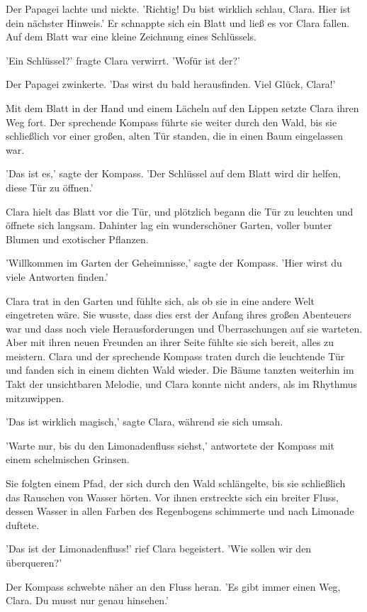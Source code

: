 \documentclass[12pt]{article}
\begin{document}
Der Papagei lachte und nickte. 'Richtig! Du bist wirklich schlau, Clara. Hier ist dein nächster Hinweis.' Er schnappte sich ein Blatt und ließ es vor Clara fallen. Auf dem Blatt war eine kleine Zeichnung eines Schlüssels.

'Ein Schlüssel?' fragte Clara verwirrt. 'Wofür ist der?'

Der Papagei zwinkerte. 'Das wirst du bald herausfinden. Viel Glück, Clara!'

Mit dem Blatt in der Hand und einem Lächeln auf den Lippen setzte Clara ihren Weg fort. Der sprechende Kompass führte sie weiter durch den Wald, bis sie schließlich vor einer großen, alten Tür standen, die in einen Baum eingelassen war.

'Das ist es,' sagte der Kompass. 'Der Schlüssel auf dem Blatt wird dir helfen, diese Tür zu öffnen.'

Clara hielt das Blatt vor die Tür, und plötzlich begann die Tür zu leuchten und öffnete sich langsam. Dahinter lag ein wunderschöner Garten, voller bunter Blumen und exotischer Pflanzen.

'Willkommen im Garten der Geheimnisse,' sagte der Kompass. 'Hier wirst du viele Antworten finden.'

Clara trat in den Garten und fühlte sich, als ob sie in eine andere Welt eingetreten wäre. Sie wusste, dass dies erst der Anfang ihres großen Abenteuers war und dass noch viele Herausforderungen und Überraschungen auf sie warteten. Aber mit ihren neuen Freunden an ihrer Seite fühlte sie sich bereit, alles zu meistern. Clara und der sprechende Kompass traten durch die leuchtende Tür und fanden sich in einem dichten Wald wieder. Die Bäume tanzten weiterhin im Takt der unsichtbaren Melodie, und Clara konnte nicht anders, als im Rhythmus mitzuwippen. 

'Das ist wirklich magisch,' sagte Clara, während sie sich umsah.

'Warte nur, bis du den Limonadenfluss siehst,' antwortete der Kompass mit einem schelmischen Grinsen.

Sie folgten einem Pfad, der sich durch den Wald schlängelte, bis sie schließlich das Rauschen von Wasser hörten. Vor ihnen erstreckte sich ein breiter Fluss, dessen Wasser in allen Farben des Regenbogens schimmerte und nach Limonade duftete.

'Das ist der Limonadenfluss!' rief Clara begeistert. 'Wie sollen wir den überqueren?'

Der Kompass schwebte näher an den Fluss heran. 'Es gibt immer einen Weg, Clara. Du musst nur genau hinsehen.'
\end{document}
